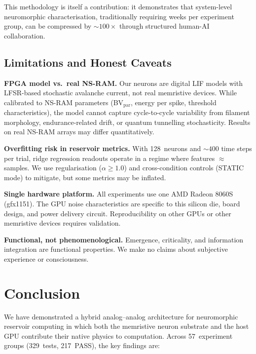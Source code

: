 \documentclass[11pt]{article}
\begin{document}
This methodology is itself a contribution: it demonstrates
that system-level neuromorphic characterisation, traditionally
requiring weeks per experiment group, can be compressed by
$\sim 100\times$ through structured human-AI collaboration.

\subsection{Limitations and Honest Caveats}

\textbf{FPGA model vs.\ real NS-RAM.}
Our neurons are digital LIF models with LFSR-based stochastic
avalanche current, not real memristive devices.  While
calibrated to NS-RAM parameters (BV$_\text{par}$, energy per
spike, threshold characteristics), the model cannot capture
cycle-to-cycle variability from filament morphology,
endurance-related drift, or quantum tunnelling stochasticity.
Results on real NS-RAM arrays may differ quantitatively.

\textbf{Overfitting risk in reservoir metrics.}
With 128~neurons and $\sim 400$ time steps per trial, ridge
regression readouts operate in a regime where features
$\approx$ samples.  We use regularisation ($\alpha \geq 1.0$)
and cross-condition controls (STATIC mode) to mitigate, but
some metrics may be inflated.

\textbf{Single hardware platform.}
All experiments use one AMD Radeon 8060S (gfx1151).  The GPU
noise characteristics are specific to this silicon die,
board design, and power delivery circuit.  Reproducibility on
other GPUs or other memristive devices requires validation.

\textbf{Functional, not phenomenological.}
Emergence, criticality, and information integration are
functional properties.  We make no claims about subjective
experience or consciousness.


\section{Conclusion}
\label{sec:conclusion}

We have demonstrated a hybrid analog--analog architecture
for neuromorphic reservoir computing in which both the
memristive neuron substrate and the host GPU contribute
their native physics to computation.  Across 57~experiment
groups (329~tests, 217~PASS), the key findings are:
\end{document}
